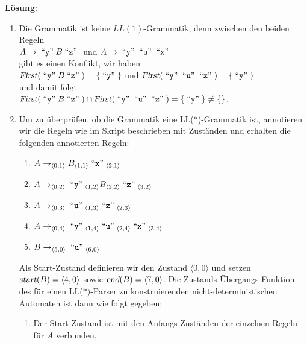 \documentclass{article}
\def\pair(#1,#2){\langle #1, #2 \rangle}
\newcommand{\solution}{
\vspace*{0.3cm}

\noindent
\textbf{L\"osung}: }
\newcommand{\quoted}[1]{\;\mbox{``\texttt{#1}''}\;}
\begin{document}
\solution
\begin{enumerate}
\item Die Grammatik ist keine $LL(1)$-Grammatik, denn zwischen den beiden Regeln
      \\[0.2cm]
      \hspace*{1.3cm}
      $A \rightarrow \quoted{y} B \quoted{z}$ \quad und \quad
      $A \rightarrow \quoted{y} \quoted{u} \quoted{x}$ 
      \\[0.2cm]
      gibt es einen Konflikt, wir haben
      \\[0.2cm]
      \hspace*{1.3cm}
      $\textsl{First}(\quoted{y} B \quoted{z}) = \{ \quoted{y} \}$ \quad und \quad
      $\textsl{First}(\quoted{y} \quoted{u} \quoted{z}) = \{ \quoted{y} \}$ 
      \\[0.2cm]
      und damit folgt
      \\[0.2cm]
      \hspace*{1.3cm}
      $\textsl{First}(\quoted{y} B \quoted{z}) \cap \textsl{First}(\quoted{y} \quoted{u} \quoted{z}) = 
      \{ \quoted{y} \} \not= \{\}$.
\item Um zu \"uberpr\"ufen, ob die Grammatik eine LL($*$)-Grammatik ist, annotieren wir die Regeln
      wie im Skript beschrieben mit Zust\"anden und erhalten die folgenden annotierten Regeln:
      \begin{enumerate}
      \item $A \rightarrow _{\pair(0,1)} B _{\pair(1,1)} \quoted{x} _{\pair(2,1)}$
      \item $A \rightarrow _{\pair(0,2)} \quoted{y} _{\pair(1,2)} B _{\pair(2,2)} \quoted{z} _{\pair(3,2)}$
      \item $A \rightarrow _{\pair(0,3)} \quoted{u} _{\pair(1,3)} \quoted{z} _{\pair(2,3)}$
      \item $A \rightarrow _{\pair(0,4)} \quoted{y} _{\pair(1,4)} \quoted{u} _{\pair(2,4)} \quoted{x} _{\pair(3,4)}$
      \item $B \rightarrow _{\pair(5,0)} \quoted{u} _{\pair(6,0)}$ 
      \end{enumerate}
      Als Start-Zustand definieren wir den Zustand $\pair(0,0)$ und setzen
      $\textsl{start}(B) = \pair(4,0)$ sowie $\textsl{end}(B) = \pair(7,0)$.  Die Zustands-\"Ubergangs-Funktion des f\"ur
      einen LL($*)$-Parser zu konstruierenden nicht-deterministischen Automaten ist dann
      wie folgt gegeben:
      \begin{enumerate}
      \item Der Start-Zustand ist mit den Anfangs-Zust\"anden der einzelnen Regeln f\"ur $A$ verbunden,

\end{enumerate}
\end{enumerate}
\end{document}
